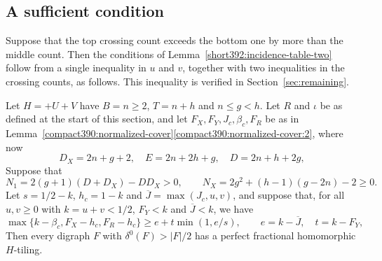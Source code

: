 \subsection{A sufficient condition}
Suppose that the top crossing count exceeds the bottom one by more than the middle count. Then the conditions of Lemma~\ref{short392:incidence-table-two} follow from a single inequality in $u$ and $v$, together with two inequalities in the crossing counts, as follows. This inequality is verified in Section~\ref{sec:remaining}.
\begin{proposition}
\label{compact390:source-criterion}
Let $H=+U+V$ have $B=n\ge2$, $T=n+h$ and $n\le g<h$.
Let $R$ and $\iota$ be as defined at the start of this section,
and let $F_X,F_Y,J_c,\beta_c,F_R$ be as in
Lemma~\ref{compact390:normalized-cover}\ref{compact390:normalized-cover:2}, where now
\[
 D_X=2n+g+2,\quad E=2n+2h+g,\quad D=2n+h+2g,
\]
Suppose that
\[
 N_1=2(g+1)(D+D_X)-DD_X>0,\qquad
 N_X=2g^2+(h-1)(g-2n)-2\ge0.
\]
Let $s=1/2-k$, $h_c=1-k$ and $\overline J=\max(J_c,u,v)$, and
suppose that, for all $u,v\ge0$ with $k=u+v<1/2$,
$F_Y<k$ and $\overline J<k$, we have
\[
 \max\{k-\beta_c,F_X-h_c,F_R-h_c\}
 \ge e+t\min(1,e/s),\qquad e=k-\overline J,\quad t=k-F_Y,
\]
Then every digraph $F$ with $\delta^0(F)>|F|/2$ has a perfect fractional homomorphic $H$-tiling.
\end{proposition}
